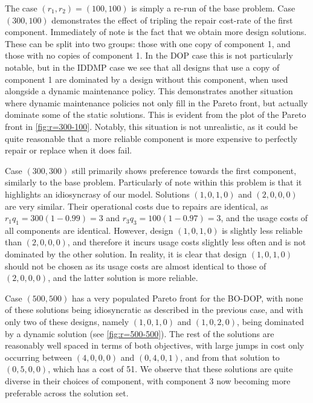 \documentclass[11pt,authoryear,a4paper]{article}
\theoremstyle{definition}
\begin{document}
The case $(r_1,r_2) = (100,100)$ is simply a re-run of the base problem. Case $(300,100)$ demonstrates the effect of tripling the repair cost-rate of the first component. Immediately of note is the fact that we obtain more design solutions. These can be split into two groups: those with one copy of component 1, and those with no copies of component 1. In the DOP case this is not particularly notable, but in the IDDMP case we see that all designs that use a copy of component 1 are dominated by a design without this component, when used alongside a dynamic maintenance policy. This demonstrates another situation where dynamic maintenance policies not only fill in the Pareto front, but actually dominate some of the static solutions. This is evident from the plot of the Pareto front in \autoref{fig:r=300-100}. Notably, this situation is not unrealistic, as it could be quite reasonable that a more reliable component is more expensive to perfectly repair or replace when it does fail. 

Case $(300,300)$ still primarily shows preference towards the first component, similarly to the base problem. Particularly of note within this problem is that it highlights an idiosyncrasy of our model. Solutions $(1,0,1,0)$ and $(2,0,0,0)$ are very similar. Their operational costs due to repairs are identical, as $r_1q_1 = 300(1-0.99) = 3$ and $r_3q_3 = 100(1-0.97) = 3$, and the usage costs of all components are identical. However, design $(1,0,1,0)$ is slightly less reliable than $(2,0,0,0)$, and therefore it incurs usage costs slightly less often and is not dominated by the other solution. In reality, it is clear that design $(1,0,1,0)$ should not be chosen as its usage costs are almost identical to those of $(2,0,0,0)$, and the latter solution is more reliable.

Case $(500,500)$ has a very populated Pareto front for the BO-DOP, with none of these solutions being idiosyncratic as described in the previous case, and with only two of these designs, namely $(1,0,1,0)$ and $(1,0,2,0)$, being dominated by a dynamic solution (see \autoref{fig:r=500-500}). The rest of the solutions are reasonably well spaced in terms of both objectives, with large jumps in cost only occurring between $(4,0,0,0)$ and $(0,4,0,1)$, and from that solution to $(0,5,0,0)$, which has a cost of 51. We observe that these solutions are quite diverse in their choices of component, with component 3 now becoming more preferable across the solution set. 
\end{document}
